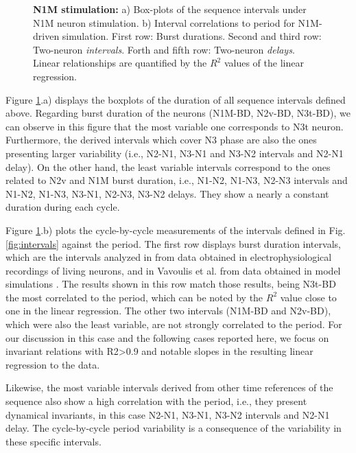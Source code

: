 \begin{figure}[hbt!]
\begin{minipage}[b]{0.53\textwidth}
\begin{minipage}[b]{\textwidth}
		\end{minipage}
	\end{minipage}
	\caption{\textbf{N1M stimulation:} a) Box-plots of the  sequence intervals under N1M neuron stimulation. b) Interval correlations to period for N1M-driven simulation. First row: Burst durations. Second and third row: Two-neuron \textit{intervals}. Forth and fifth row: Two-neuron \textit{delays}. Linear relationships are quantified by the $R^2$ values of the linear regression.}
	\label{fig:invariant n1m}
\end{figure}

Figure \ref{fig:invariant n1m}.a) displays the boxplots of the duration of all sequence intervals defined above. Regarding burst duration of the neurons (N1M-BD, N2v-BD, N3t-BD), we can observe in this figure that the most variable one corresponds to N3t neuron. Furthermore, the derived intervals which cover N3 phase are also the ones presenting larger variability (i.e., N2-N1, N3-N1 and N3-N2 intervals and N2-N1 delay). On the other hand, the least variable intervals correspond to the ones related to N2v and N1M burst duration, i.e., N1-N2, N1-N3, N2-N3 intervals and N1-N2, N1-N3, N3-N1, N2-N3, N3-N2 delays. They show a nearly a constant duration during each cycle.

Figure \ref{fig:invariant n1m}.b) plots the cycle-by-cycle measurements of the intervals defined in Fig. \ref{fig:intervals} against the period. The first row displays burst duration intervals, which are the intervals analyzed in \textcite{elliott_temporal_1991} from data obtained in electrophysiological recordings of living neurons, and in Vavoulis et al. from data obtained in model simulations \parencite{vavoulis_dynamic_2007}. The results shown in this row match those results, being N3t-BD the most correlated to the period, which can be noted by the $R^2$ value close to one in the linear regression. The other two intervals (N1M-BD and N2v-BD), which were also the least variable, are not strongly correlated to the period. For our discussion in this case and the following cases reported here, we focus on invariant relations with R2>0.9 and notable slopes in the resulting linear regression to the data. 

Likewise, the most variable intervals derived from other time references of the sequence also show a high correlation with the period, i.e., they present dynamical invariants, in this case N2-N1, N3-N1, N3-N2 intervals and N2-N1 delay. The cycle-by-cycle period variability is a consequence of the variability in these specific intervals.

